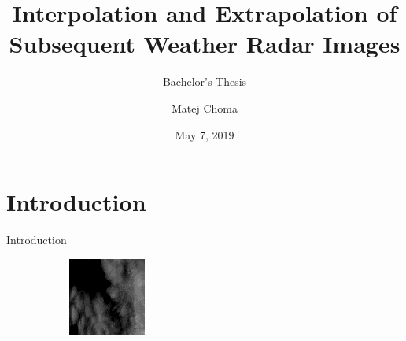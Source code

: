 \documentclass{beamer}
\title[BP_Choma_Matej_2019]{Interpolation and Extrapolation of Subsequent Weather Radar Images}
\subtitle{Bachelor's Thesis}
\author{Matej Choma}
\institute{Department of Applied Mathematics\\
Supervisor: Ing. Jakub Bartel}
\date{May 7, 2019}
\begin{document}
\begin{frame}
  \titlepage
\end{frame}


\section{Introduction}

\begin{frame}{Introduction}
	\begin{figure}
	    \begin{subfigure}{.3\textwidth}
	        \centering
	        \includegraphics[width=\linewidth]{fig/radarcs1801030500.png}
	    \end{subfigure}
	    \begin{subfigure}{.3\textwidth}
	        \centering

\end{subfigure}
\end{figure}
\end{frame}
\end{document}
